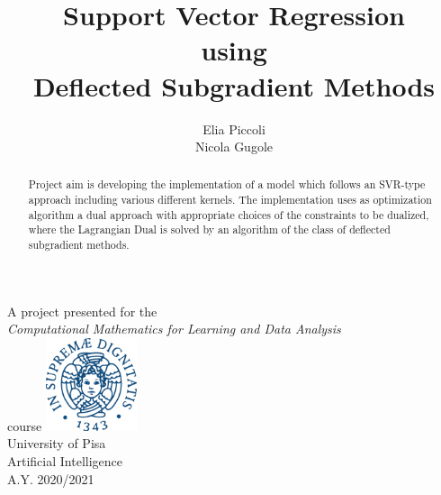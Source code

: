 \documentclass[12pt]{article}
\title{Support Vector Regression\\using\\Deflected Subgradient Methods}
\author{Elia Piccoli\\Nicola Gugole}
\begin{document}
	\begin{titlepage}
		\maketitle
	   \begin{center}
		\vspace{0.5cm}
	        A project presented for the\\\textit{Computational Mathematics for Learning and Data Analysis}\\course
	       \vfill	     
	       \includegraphics[width=0.2\textwidth]{unipi.png}\\
	       University of Pisa\\
	       Artificial Intelligence\\
	       A.Y. 2020/2021\\
	            
	   \end{center}
	\end{titlepage}
	
	\newpage
	\tableofcontents
	\vspace{4cm}
	\begin{abstract}
		 Project aim is developing the implementation of a model which follows an SVR-type approach including various different kernels. The implementation uses as optimization algorithm a dual approach with appropriate choices of the constraints to be dualized, where the Lagrangian Dual is solved by an algorithm of the class of deflected subgradient methods.
	\end{abstract}
	\pagebreak
	
\end{document}
